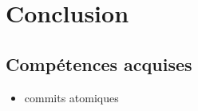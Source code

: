 \chapter{Conclusion}

\section{Compétences acquises}

\begin{itemize}
\item commits atomiques
\end{itemize}

